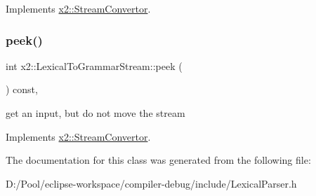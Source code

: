 Implements \hyperlink{classx2_1_1_stream_convertor_a5b387cc560794db5ac2f0c35dd4023d1}{x2\+::\+Stream\+Convertor}.

\mbox{\label{classx2_1_1_lexical_to_grammar_stream_a67a0e2b6ed998fd1dea1c9829be4461f}} 
\subsubsection{\texorpdfstring{peek()}{peek()}}
{\footnotesize\ttfamily int x2\+::\+Lexical\+To\+Grammar\+Stream\+::peek (\begin{DoxyParamCaption}{ }\end{DoxyParamCaption}) const\hspace{0.3cm}{\ttfamily [inline]}, {\ttfamily [virtual]}}

get an input, but do not move the stream 

Implements \hyperlink{classx2_1_1_stream_convertor_a9bc76cb1b81f1b11c9967f37f01bf2be}{x2\+::\+Stream\+Convertor}.



The documentation for this class was generated from the following file\+:\begin{DoxyCompactItemize}
\item 
D\+:/\+Pool/eclipse-\/workspace/compiler-\/debug/include/Lexical\+Parser.\+h\end{DoxyCompactItemize}

